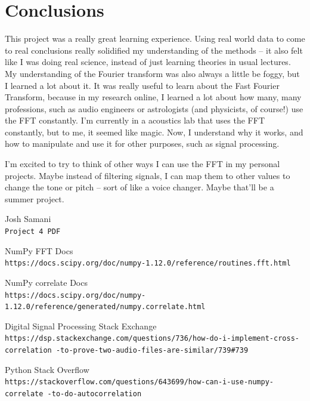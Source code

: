 \documentclass[12pt]{article}
\begin{document}
\section*{Conclusions}

This project was a really great learning experience. Using real world data to come to real conclusions really solidified my understanding of the methods -- it also felt like I was doing real science, instead of just learning theories in usual lectures. My understanding of the Fourier transform was also always a little be foggy, but I learned a lot about it. It was really useful to learn about the Fast Fourier Transform, because in my research online, I learned a lot about how many, many professions, such as audio engineers or astrologists (and physicists, of course!) use the FFT constantly. I'm currently in a acoustics lab that uses the FFT constantly, but to me, it seemed like magic. Now, I understand why it works, and how to manipulate and use it for other purposes, such as signal processing.

I'm excited to try to think of other ways I can use the FFT in my personal projects. Maybe instead of filtering signals, I can map them to other values to change the tone or pitch -- sort of like a voice changer. Maybe that'll be a summer project.




\begin{thebibliography}{9}

 Josh Samani
\\\texttt{Project 4 PDF}

 NumPy FFT Docs
\\\texttt{https://docs.scipy.org/doc/numpy-1.12.0/reference/routines.fft.html}

 NumPy correlate Docs
\\\texttt{https://docs.scipy.org/doc/numpy-1.12.0/reference/generated/numpy.correlate.html}

 Digital Signal Processing Stack Exchange
\\\texttt{https://dsp.stackexchange.com/questions/736/how-do-i-implement-cross-correlation
-to-prove-two-audio-files-are-similar/739\#739}

 Python Stack Overflow
\\\texttt{https://stackoverflow.com/questions/643699/how-can-i-use-numpy-correlate
-to-do-autocorrelation}





\end{thebibliography}
\end{document}
